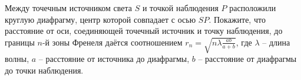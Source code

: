 \documentclass[__main__.tex]{subfiles}
\begin{document}
Между точечным источником света $S$ и точкой наблюдения $P$ расположили круглую диафрагму, центр которой совпадает с осью $SP$. Покажите, что расстояние от оси, соединяющей точечный источник и точку наблюдения, до границы $n$-й зоны Френеля даётся соотношением $r_n=\sqrt{n\lambda\frac{ab}{a+b}}$, где $\lambda$ -- длина волны, $a$ -- расстояние от источника до диафрагмы, $b$ -- расстояние от диафрагмы до точки наблюдения.\\ 

\end{document}

